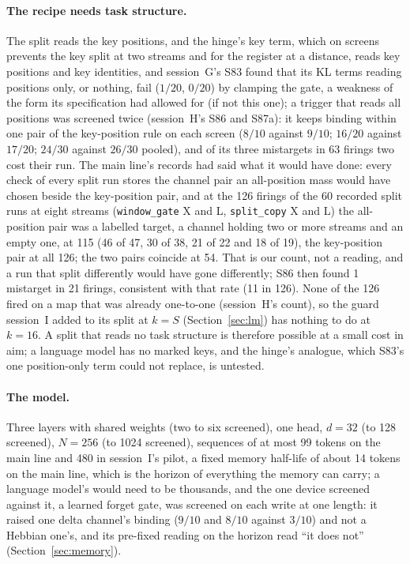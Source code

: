 \documentclass[11pt]{article}
\begin{document}
\paragraph{The recipe needs task structure.} The split reads the key positions, and the hinge's key term, which on screens prevents the key split at two streams and for the register at a distance, reads key positions and key identities, and session~G's S83 found that its KL terms reading positions only, or nothing, fail ($1/20$, $0/20$) by clamping the gate, a weakness of the form its specification had allowed for (if not this one); a trigger that reads all positions was screened twice (session~H's S86 and S87a): it keeps binding within one pair of the key-position rule on each screen ($8/10$ against $9/10$; $16/20$ against $17/20$; $24/30$ against $26/30$ pooled), and of its three mistargets in 63 firings two cost their run. The main line's records had said what it would have done: every check of every split run stores the channel pair an all-position mass would have chosen beside the key-position pair, and at the 126 firings of the 60 recorded split runs at eight streams (\texttt{window\_gate} X and L, \texttt{split\_copy} X and L) the all-position pair was a labelled target, a channel holding two or more streams and an empty one, at 115 (46 of 47, 30 of 38, 21 of 22 and 18 of 19), the key-position pair at all 126; the two pairs coincide at 54. That is our count, not a reading, and a run that split differently would have gone differently; S86 then found 1 mistarget in 21 firings, consistent with that rate (11 in 126). None of the 126 fired on a map that was already one-to-one (session~H's count), so the guard session~I added to its split at $k = S$ (Section~\ref{sec:lm}) has nothing to do at $k = 16$. A split that reads no task structure is therefore possible at a small cost in aim; a language model has no marked keys, and the hinge's analogue, which S83's one position-only term could not replace, is untested.

\paragraph{The model.} Three layers with shared weights (two to six screened), one head, $d = 32$ (to 128 screened), $N = 256$ (to 1024 screened), sequences of at most 99 tokens on the main line and 480 in session~I's pilot, a fixed memory half-life of about 14 tokens on the main line, which is the horizon of everything the memory can carry; a language model's would need to be thousands, and the one device screened against it, a learned forget gate, was screened on each write at one length: it raised one delta channel's binding ($9/10$ and $8/10$ against $3/10$) and not a Hebbian one's, and its pre-fixed reading on the horizon read ``it does not'' (Section~\ref{sec:memory}).
\end{document}
